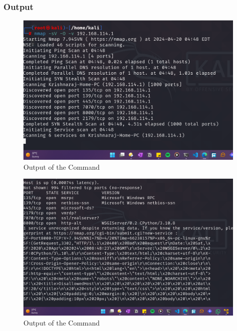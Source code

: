 \documentclass[11pt]{article}
\begin{document}
\subsubsection*{Output}
\begin{figure}[H]
    \centering
    \includegraphics[width=0.99\textwidth]{a3_ss (2).png}
    \caption{Output of the Command}
\end{figure}
\begin{figure}[H]
    \centering
    \includegraphics[width=0.99\textwidth]{a3_ss (3).png}
    \caption{Output of the Command}
\end{figure}
\end{document}
